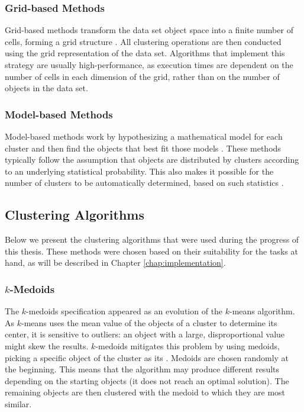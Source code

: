 \subsubsection*{Grid-based Methods}

Grid-based methods transform the data set object space into a finite number of
cells, forming a grid structure
\cite{han2006data,DBLP:journals/corr/abs-1205-1117}. All clustering operations
are then conducted using the grid representation of the data set. Algorithms
that implement this strategy are usually high-performance, as execution times
are dependent on the number of cells in each dimension of the grid, rather than
on the number of objects in the data set.

\subsubsection*{Model-based Methods}

Model-based methods work by hypothesizing a mathematical model for each cluster
and then find the objects that best fit those models
\cite{DBLP:journals/corr/abs-1205-1117}. These methods typically follow the
assumption that objects are distributed by clusters according to an underlying
statistical probability. This also makes it possible for the number of clusters
to be automatically determined, based on such statistics \cite{han2006data}.

\subsection{Clustering Algorithms}\label{sec:clusteralgo}

Below we present the clustering algorithms that were used during the progress of
this thesis. These methods were chosen based on their suitability for the tasks
at hand, as will be described in Chapter \ref{chap:implementation}.

\subsubsection*{$k$-Medoids}

The $k$-medoids specification appeared as an evolution of the $k$-means
algorithm. As $k$-means uses the mean value of the objects of a cluster to
determine its center, it is sensitive to outliers: an object with a large,
disproportional value might skew the results. $k$-medoids mitigates this problem
by using medoids, picking a specific object of the cluster as its 
\cite{han2006data}. Medoids are chosen randomly at the beginning. This means
that the algorithm may produce different results depending on the starting
objects (it does not reach an optimal solution). The remaining objects are then
clustered with the medoid to which they are most similar.

